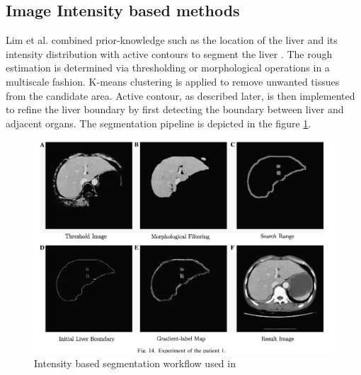 \documentclass[]{article}
\begin{document}
	\subsection*{Image Intensity based methods}
	
	Lim et al. combined prior-knowledge such as the location of the liver
	and its intensity distribution with active contours to segment the
	liver \cite{Lim2004, Lim2005, Lim2006}. The rough estimation is determined via thresholding or
	morphological operations in a multiscale fashion. K-means clustering is
	applied to remove unwanted tissues from the candidate area. Active
	contour, as described later, is then implemented to refine the liver boundary by first
	detecting the boundary between liver and adjacent organs.
	The segmentation pipeline is depicted in the figure \ref{IntensityBasedLim}.
	
	\begin{figure}[ht!]
		\centering
		\includegraphics[width=0.7\linewidth]{images/image10}
		\caption{Intensity based segmentation workflow used in \cite{Lim2006}}
		\label{IntensityBasedLim}
	\end{figure}
	
\end{document}
